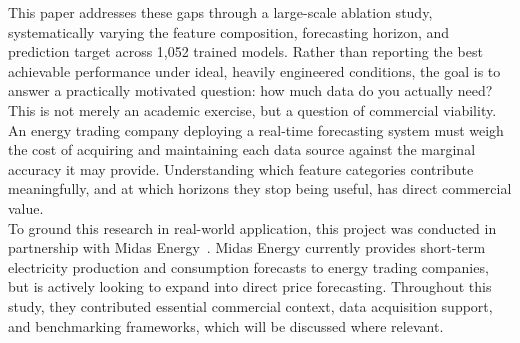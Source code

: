 This paper addresses these gaps through a large-scale ablation study, 
systematically varying the feature composition, forecasting horizon, and 
prediction target across 1,052 trained models. Rather than reporting the best 
achievable performance under ideal, heavily engineered conditions, the goal is 
to answer a practically motivated question: how much data do you actually need? 
This is not merely an academic exercise, but a question of commercial 
viability. An energy trading company deploying a real-time forecasting system 
must weigh the cost of acquiring and maintaining each data source against the 
marginal accuracy it may provide. Understanding which feature categories 
contribute meaningfully, and at which horizons they stop being useful, has 
direct commercial value.\\

To ground this research in real-world application, this project was conducted 
in partnership with Midas Energy~\cite{midasEnergy}. Midas Energy currently 
provides short-term electricity production and consumption forecasts to energy 
trading companies, but is actively looking to expand into direct price 
forecasting. Throughout this study, they contributed essential commercial 
context, data acquisition support, and benchmarking frameworks, which will be 
discussed where relevant.\\

